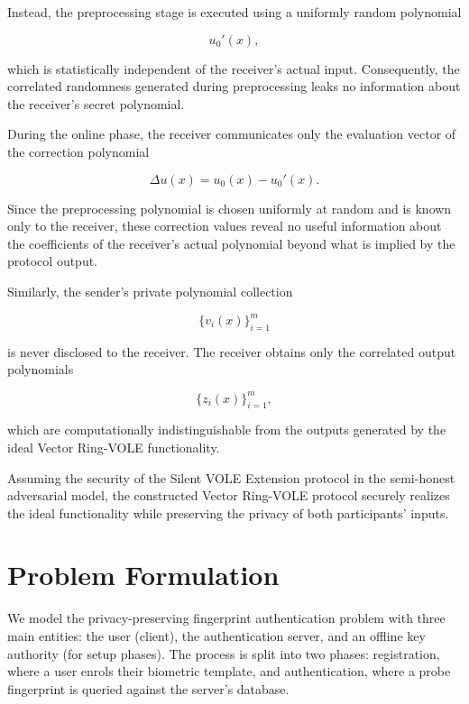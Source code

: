 \documentclass[11pt,a4paper]{article}
\begin{document}
Instead, the preprocessing stage is executed using a uniformly random polynomial

\[
u_0'(x),
\]

which is statistically independent of the receiver's actual input. Consequently, the correlated randomness
generated during preprocessing leaks no information about the receiver's secret polynomial.

During the online phase, the receiver communicates only the evaluation vector of the correction polynomial

\[
\Delta u(x)=u_0(x)-u_0'(x).
\]

Since the preprocessing polynomial is chosen uniformly at random and is known only to the receiver, these
correction values reveal no useful information about the coefficients of the receiver's actual polynomial
beyond what is implied by the protocol output.

Similarly, the sender's private polynomial collection

\[
\{v_i(x)\}_{i=1}^{m}
\]

is never disclosed to the receiver. The receiver obtains only the correlated output polynomials

\[
\{z_i(x)\}_{i=1}^{m},
\]

which are computationally indistinguishable from the outputs generated by the ideal Vector Ring-VOLE
functionality.

Assuming the security of the Silent VOLE Extension protocol in the semi-honest adversarial model, the
constructed Vector Ring-VOLE protocol securely realizes the ideal functionality while preserving the privacy
of both participants' inputs.

\section{Problem Formulation}

We model the privacy-preserving fingerprint authentication problem with three main entities: the user (client), the authentication server, and an offline key authority (for setup phases). The process is split into two phases: registration, where a user enrols their biometric template, and authentication, where a probe fingerprint is queried against the server's database.
\end{document}
